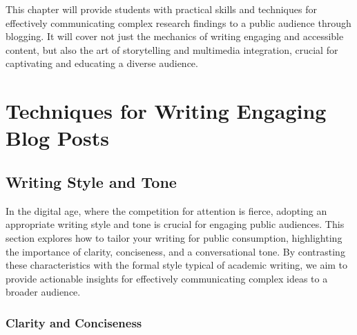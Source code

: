 \documentclass[
]{book}
\begin{document}
This chapter will provide students with practical skills and techniques for effectively communicating complex research findings to a public audience through blogging. It will cover not just the mechanics of writing engaging and accessible content, but also the art of storytelling and multimedia integration, crucial for captivating and educating a diverse audience.

\hypertarget{techniques-for-writing-engaging-blog-posts}{%
\section*{Techniques for Writing Engaging Blog Posts}\label{techniques-for-writing-engaging-blog-posts}}

\hypertarget{writing-style-and-tone}{%
\subsection*{Writing Style and Tone}\label{writing-style-and-tone}}

In the digital age, where the competition for attention is fierce, adopting an appropriate writing style and tone is crucial for engaging public audiences. This section explores how to tailor your writing for public consumption, highlighting the importance of clarity, conciseness, and a conversational tone. By contrasting these characteristics with the formal style typical of academic writing, we aim to provide actionable insights for effectively communicating complex ideas to a broader audience.

\hypertarget{clarity-and-conciseness}{%
\subsubsection{Clarity and Conciseness}\label{clarity-and-conciseness}}
\end{document}
